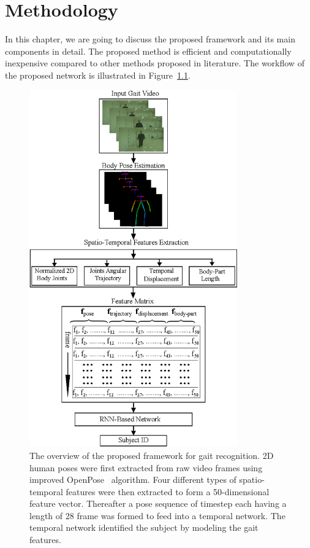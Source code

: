 \chapter{Methodology}\label{ch:methodology}
In this chapter, we are going to discuss the proposed framework and its main components in detail. The proposed method is efficient and computationally inexpensive compared to other methods proposed in literature. The workflow of the proposed network is illustrated in Figure~\ref{fig:overview_proposed_method}.

\begin{figure}
	\centering
	\includegraphics[width=0.8\textwidth]{figures/proposed_method.eps}
	\caption [The overview of the proposed framework for gait recognition] 
	{The overview of the proposed framework for gait recognition. 2D human poses were first extracted from raw video frames using improved OpenPose~\cite{Cao_19} algorithm. Four different types of spatio-temporal features were then extracted to form a 50-dimensional feature vector. Thereafter a pose sequence of timestep each having a length of 28 frame was formed to feed into a temporal network. The temporal network identified the subject by modeling the gait features. \label{fig:overview_proposed_method}
	}	
\end{figure}


